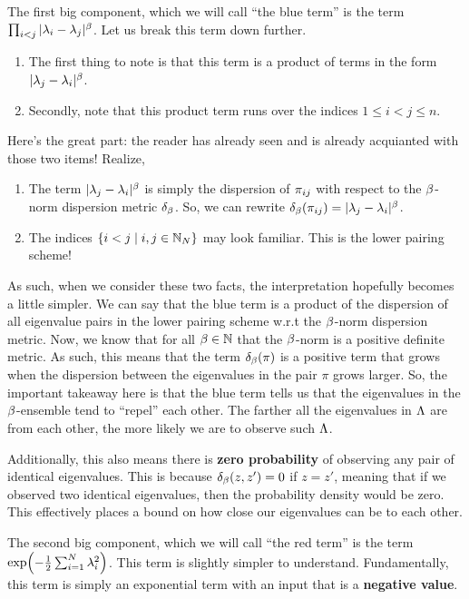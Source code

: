  The first big component, which we will call ``the blue term'' is the term ${\prod_{i < j} |\lambda_i - \lambda_j|^{\beta}}$. Let us break this term down further.
  \begin{enumerate}
    \item The first thing to note is that this term is a product of terms in the form $|\lambda_j - \lambda_i|^\beta$.
    \item Secondly, note that this product term runs over the indices $1 \leq i < j \leq n$.
  \end{enumerate}
    Here's the great part: the reader has already seen and is already acquianted with those two items! Realize,
  \begin{enumerate}
    \item The term $|\lambda_j - \lambda_i|^\beta$ is simply the dispersion of ${\pi_{ij}}$ with respect to the $\beta$-norm dispersion metric $\delta_\beta$.
      So, we can rewrite $\delta_\beta({\pi_{ij}}) = |\lambda_j - \lambda_i|^\beta$.
    \item The indices $\{i < j \mid i,j \in \mathbb{N}_N\}$ may look familiar. This is the lower pairing scheme!
  \end{enumerate}
  As such, when we consider these two facts, the interpretation hopefully becomes a little simpler. We can say that the blue term is a product of the dispersion of all eigenvalue pairs in the lower pairing scheme w.r.t the $\beta$-norm dispersion metric.
Now, we know that for all $\beta \in \mathbb{N}$ that the $\beta$-norm is a positive definite metric. As such, this means that the term $\delta_\beta(\pi)$ is a positive term that grows when the dispersion between the eigenvalues in the pair $\pi$ grows larger.
So, the important takeaway here is that the blue term tells us that the eigenvalues in the $\beta$-ensemble tend to ``repel'' each other.
The farther all the eigenvalues in $\Lambda$ are from each other, the more likely we are to observe such $\Lambda$.

Additionally, this also means there is \textbf{zero probability} of observing any pair of identical eigenvalues.
This is because $\delta_\beta(z,z') = 0$ if $z = z'$, meaning that if we observed two identical eigenvalues, then the probability density would be zero.
This effectively places a bound on how close our eigenvalues can be to each other.

\bigskip

 The second big component, which we will call ``the red term'' is the term ${\exp({-\frac{1}{2} \sum_{i=1}^N \lambda_i^2})}$. This term is slightly simpler to understand.
Fundamentally, this term is simply an exponential term with an input that is a \textbf{negative value}.

